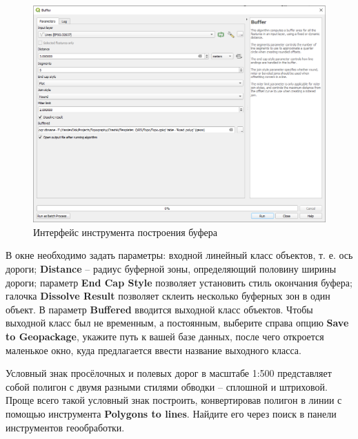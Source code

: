 \documentclass[
  12pt,
]{book}
\begin{document}
\begin{figure}
\centering
\includegraphics{images/Practice/Buffer.png}
\caption{Интерфейс инструмента построения буфера}
\end{figure}

В окне необходимо задать параметры: входной линейный класс объектов, т. е. ось дороги; \textbf{Distance} -- радиус буферной зоны, определяющий половину ширины дороги; параметр \textbf{End Cap Style} позволяет установить стиль окончания буфера; галочка \textbf{Dissolve Result} позволяет склеить несколько буферных зон в один объект. В параметр \textbf{Buffered} вводится выходной класс объектов. Чтобы выходной класс был не временным, а постоянным, выберите справа опцию \textbf{Save to Geopackage}, укажите путь к вашей базе данных, после чего откроется маленькое окно, куда предлагается ввести название выходного класса.

Условный знак просёлочных и полевых дорог в масштабе 1:500 представляет собой полигон с двумя разными стилями обводки -- сплошной и штриховой. Проще всего такой условный знак построить, конвертировав полигон в линии с помощью инструмента \textbf{Polygons to lines}. Найдите его через поиск в панели инструментов геообработки.
\end{document}
